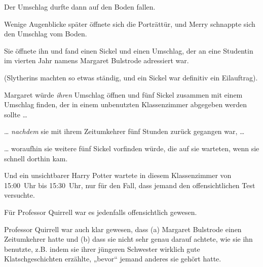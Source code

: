 Der Umschlag durfte dann auf den Boden fallen.

Wenige Augenblicke später öffnete sich die Porträttür, und Merry schnappte sich den Umschlag vom Boden.

Sie öffnete ihn und fand einen Sickel und einen Umschlag, der an eine Studentin im vierten Jahr namens Margaret Bulstrode adressiert war.

(Slytherins machten so etwas ständig, und ein Sickel war definitiv ein Eilauftrag).

Margaret würde \emph{ihren} Umschlag öffnen und fünf Sickel zusammen mit einem Umschlag finden, der in einem unbenutzten Klassenzimmer abgegeben werden sollte …

… \emph{nachdem} sie mit ihrem Zeitumkehrer fünf Stunden zurück gegangen war, …

… woraufhin sie weitere fünf Sickel vorfinden würde, die auf sie warteten, wenn sie schnell dorthin kam.

Und ein unsichtbarer Harry Potter wartete in diesem Klassenzimmer von 15:00~Uhr bis 15:30~Uhr, nur für den Fall, dass jemand den offensichtlichen Test versuchte.

Für Professor Quirrell war es jedenfalls offensichtlich gewesen.

Professor Quirrell war auch klar gewesen, dass (a) Margaret Bulstrode einen Zeitumkehrer hatte und (b) dass sie nicht sehr genau darauf achtete, wie sie ihn benutzte, z.B. indem sie ihrer jüngeren Schwester wirklich gute Klatschgeschichten erzählte, „bevor“ jemand anderes sie gehört hatte.

